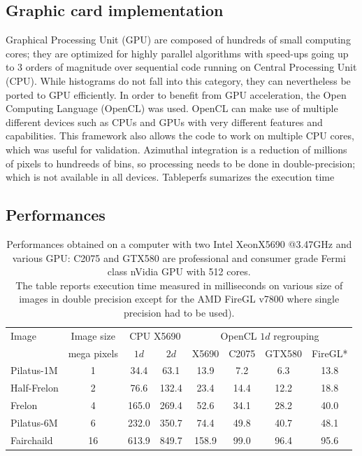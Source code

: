 \documentclass[a4paper]{jpconf}
\begin{document}
\subsection{Graphic card implementation}
Graphical Processing Unit (GPU) are composed of hundreds of
small computing cores; they are optimized for highly parallel algorithms
with speed-ups going up to 3 orders of magnitude over sequential code running
on Central Processing Unit (CPU).
While histograms do not fall into this category, they can  nevertheless be
ported to GPU efficiently. In order to benefit from GPU acceleration, the Open
Computing Language (OpenCL) was used. OpenCL can make use of multiple  different
devices such as CPUs and GPUs with very different features and capabilities.
This framework also allows the code to work on multiple CPU cores, which was
useful for validation. Azimuthal integration is a reduction
of millions of pixels to hundreeds of bins, so processing needs to be done in
double-precision; which is not available in all devices. Table{perfs} sumarizes
the execution time

\subsection{Performances}
\begin{table}[h]
\caption{\label{perfs}Performances obtained on a computer with two Intel
XeonX5690 @3.47GHz and various GPU: C2075 and GTX580 are professional and consumer grade Fermi class nVidia GPU with 512 cores.\\
 The table reports execution time measured in milliseconds on various size of
 images in double precision except for the AMD FireGL v7800 where single
 precision had to be used).}
\begin{center}
\begin{tabular}{|l|c||c|c||c|c|c|c|}
\hline
Image               & Image size 	& \multicolumn{2}{|c||}{CPU X5690}& \multicolumn{4}{|c|}{OpenCL $1d$ regrouping} \\
					& mega pixels	& $1d$	&	$2d$	&	X5690	&	C2075	&	GTX580	&	FireGL* \\
\hline
Pilatus-1M 			& 1  			& 34.4  &	63.1	&	13.9	&	7.2		&	6.3		&	13.8 \\
Half-Frelon 		& 2  			& 76.6  &   132.4   &	23.4	&	14.4	&	12.2	&	18.8 \\
Frelon 				& 4  			& 165.0	&	269.4   &	52.6	&	34.1	&	28.2	&	40.0 \\
Pilatus-6M 			& 6  			& 232.0	&	350.7	&	74.4	&	49.8	&	40.7	&	48.1 \\
Fairchaild 			& 16 			& 613.9	&	849.7   &	158.9	&	99.0	&	96.4	&	95.6 \\
\hline
\end{tabular}
\end{center}
\end{table}
\end{document}
